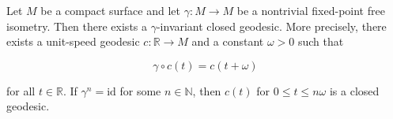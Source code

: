 Let $M$ be a compact surface and let $\gamma: M \to M$ be a nontrivial fixed-point free isometry. Then there exists a $\gamma$-invariant closed geodesic. More precisely, there exists a unit-speed geodesic $c: \mathbb{R} \to M$ and a constant $\omega > 0$ such that

$$\gamma \circ c(t) = c(t + \omega)$$

for all $t \in \mathbb{R}$. If $\gamma^n = \text{id}$ for some $n \in \mathbb{N}$, then $c(t)$ for $0 \leq t \leq n\omega$ is a closed geodesic.
